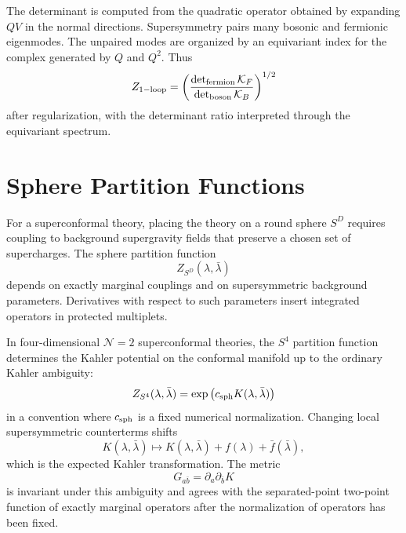 The determinant is computed from the quadratic operator obtained by expanding
\(QV\) in the normal directions.  Supersymmetry pairs many bosonic and
fermionic eigenmodes.  The unpaired modes are organized by an equivariant
index for the complex generated by \(Q\) and \(Q^2\).  Thus
\[
  Z_{\rm 1-loop}
  =
  \left(
    \frac{\det_{\rm fermion} \mathcal K_F}
         {\det_{\rm boson} \mathcal K_B}
  \right)^{1/2}
\]
after regularization, with the determinant ratio interpreted through the
equivariant spectrum.

\section{Sphere Partition Functions}

For a superconformal theory, placing the theory on a round sphere \(S^D\)
requires coupling to background supergravity fields that preserve a chosen
set of supercharges.  The sphere partition function
\[
  Z_{S^D}(\lambda,\bar\lambda)
\]
depends on exactly marginal couplings and on supersymmetric background
parameters.  Derivatives with respect to such parameters insert integrated
operators in protected multiplets.

In four-dimensional \(\mathcal N=2\) superconformal theories, the
\(S^4\) partition function determines the Kahler potential on the conformal
manifold up to the ordinary Kahler ambiguity:
\begin{equation}
  Z_{S^4}(\lambda,\bar\lambda)
  =
  \exp\left(c_{\rm sph}K(\lambda,\bar\lambda)\right)
  \label{eq:s4-partition-kahler-potential}
\end{equation}
in a convention where \(c_{\rm sph}\) is a fixed numerical normalization.
Changing local supersymmetric counterterms shifts
\[
  K(\lambda,\bar\lambda)
  \mapsto
  K(\lambda,\bar\lambda)+f(\lambda)+\bar f(\bar\lambda),
\]
which is the expected Kahler transformation.  The metric
\[
  G_{a\bar b}=\partial_a\partial_{\bar b}K
\]
is invariant under this ambiguity and agrees with the separated-point
two-point function of exactly marginal operators after the normalization of
operators has been fixed.

